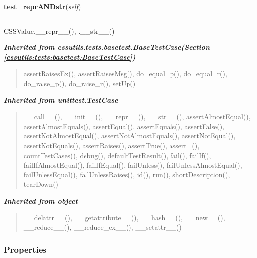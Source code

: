     \vspace{0.5ex}

\hspace{.8\funcindent}\begin{boxedminipage}{\funcwidth}

    \raggedright \textbf{test\_reprANDstr}(\textit{self})

    \vspace{-1.5ex}

    \rule{\textwidth}{0.5\fboxrule}
\setlength{\parskip}{2ex}
    CSSValue.\_\_repr\_\_(), .\_\_str\_\_()

\setlength{\parskip}{1ex}
    \end{boxedminipage}


\large{\textbf{\textit{Inherited from cssutils.tests.basetest.BaseTestCase\textit{(Section \ref{cssutils:tests:basetest:BaseTestCase})}}}}

\begin{quote}
assertRaisesEx(), assertRaisesMsg(), do\_equal\_p(), do\_equal\_r(), do\_raise\_p(), do\_raise\_r(), setUp()
\end{quote}

\large{\textbf{\textit{Inherited from unittest.TestCase}}}

\begin{quote}
\_\_call\_\_(), \_\_init\_\_(), \_\_repr\_\_(), \_\_str\_\_(), assertAlmostEqual(), assertAlmostEquals(), assertEqual(), assertEquals(), assertFalse(), assertNotAlmostEqual(), assertNotAlmostEquals(), assertNotEqual(), assertNotEquals(), assertRaises(), assertTrue(), assert\_(), countTestCases(), debug(), defaultTestResult(), fail(), failIf(), failIfAlmostEqual(), failIfEqual(), failUnless(), failUnlessAlmostEqual(), failUnlessEqual(), failUnlessRaises(), id(), run(), shortDescription(), tearDown()
\end{quote}

\large{\textbf{\textit{Inherited from object}}}

\begin{quote}
\_\_delattr\_\_(), \_\_getattribute\_\_(), \_\_hash\_\_(), \_\_new\_\_(), \_\_reduce\_\_(), \_\_reduce\_ex\_\_(), \_\_setattr\_\_()
\end{quote}


  \subsubsection{Properties}


